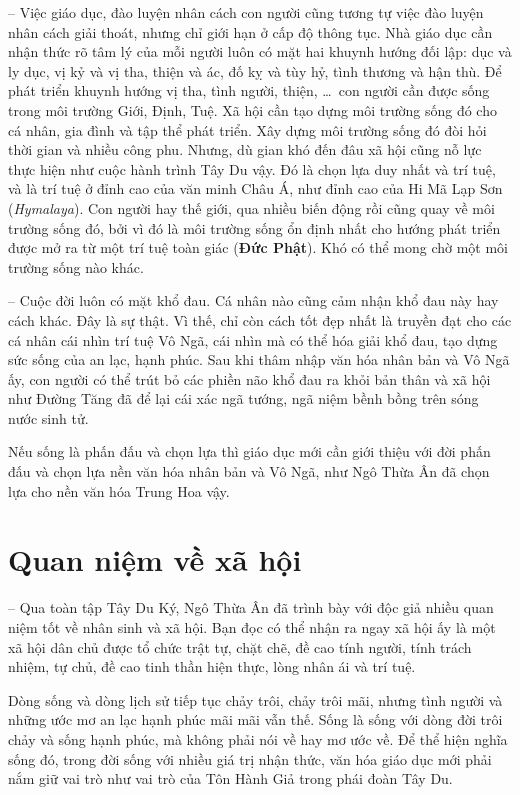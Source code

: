 -- Việc giáo dục, đào luyện nhân cách con người cũng tương tự việc đào luyện nhân cách giải thoát, nhưng chỉ giới hạn ở cấp độ thông tục. Nhà giáo dục cần nhận thức rõ tâm lý của mỗi người luôn có mặt hai khuynh hướng đối lập: dục và ly dục, vị kỷ và vị tha, thiện và ác, đố kỵ và tùy hỷ, tình thương và hận thù. Để phát triển khuynh hướng vị tha, tình người, thiện, \ldots ~con người cần được sống trong môi trường Giới, Định, Tuệ. Xã hội cần tạo dựng môi trường sống đó cho cá nhân, gia đình và tập thể phát triển. Xây dựng môi trường sống đó đòi hỏi thời gian và nhiều công phu. Nhưng, dù gian khó đến đâu xã hội cũng nỗ lực thực hiện như cuộc hành trình Tây Du vậy. Đó là chọn lựa duy nhất và trí tuệ, và là trí tuệ ở đỉnh cao của văn minh Châu Á, như đỉnh cao của Hi Mã Lạp Sơn (\emph{Hymalaya}). Con người hay thế giới, qua nhiều biến động rồi cũng quay về môi trường sống đó, bởi vì đó là môi trường sống ổn định nhất cho hướng phát triển được mở ra từ một trí tuệ toàn giác ({\bf Đức Phật}). Khó có thể mong chờ một môi trường sống nào khác.

-- Cuộc đời luôn có mặt khổ đau. Cá nhân nào cũng cảm nhận khổ đau này hay cách khác. Đây là sự thật. Vì thế, chỉ còn cách tốt đẹp nhất là truyền đạt cho các cá nhân cái nhìn trí tuệ Vô Ngã, cái nhìn mà có thể hóa giải khổ đau, tạo dựng sức sống của an lạc, hạnh phúc. Sau khi thâm nhập văn hóa nhân bản và Vô Ngã ấy, con người có thể trút bỏ các phiền não khổ đau ra khỏi bản thân và xã hội như Đường Tăng đã để lại cái xác ngã tướng, ngã niệm bềnh bồng trên sóng nước sinh tử.

Nếu sống là phấn đấu và chọn lựa thì giáo dục mới cần giới thiệu với đời phấn đấu và chọn lựa nền văn hóa nhân bản và Vô Ngã, như Ngô Thừa Ân đã chọn lựa cho nền văn hóa Trung Hoa vậy.

\section{Quan niệm về xã hội} %
\label{sec:98_99_100_xa_hoi}

-- Qua toàn tập Tây Du Ký, Ngô Thừa Ân đã trình bày với độc giả nhiều quan niệm tốt về nhân sinh và xã hội. Bạn đọc có thể nhận ra ngay xã hội ấy là một xã hội dân chủ được tổ chức trật tự, chặt chẽ, đề cao tính người, tính trách nhiệm, tự chủ, đề cao tinh thần hiện thực, lòng nhân ái và trí tuệ.

\hrulefill

Dòng sống và dòng lịch sử tiếp tục chảy trôi, chảy trôi mãi, nhưng tình người và những ước mơ an lạc hạnh phúc mãi mãi vẫn thế. Sống là sống với dòng đời trôi chảy và sống hạnh phúc, mà không phải nói về hay mơ ước về. Để thể hiện nghĩa sống đó, trong đời sống với nhiều giá trị nhận thức, văn hóa giáo dục mới phải nắm giữ vai trò như vai trò của Tôn Hành Giả trong phái đoàn Tây Du.

\afterpage{\blankpage}